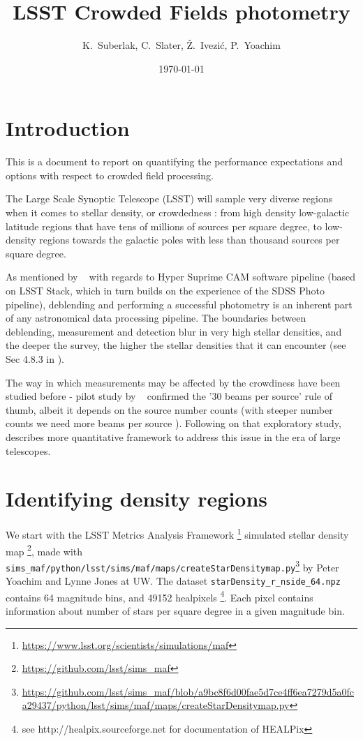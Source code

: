 \documentclass[DM,lsstdraft,toc,usenatbib]{lsstdoc}
\title[Crowded fields ]{LSST  Crowded Fields photometry}
\author{
K.~Suberlak, C.~Slater,
\v{Z}.~Ivezi\'c, P.~Yoachim}
\date{\today}
\begin{document}
\maketitle

\section{Introduction}

This is a document to report on quantifying the performance expectations and options with respect to crowded field processing.

The Large Scale Synoptic Telescope (LSST) will sample very diverse regions when it comes to stellar density, or crowdedness : from high density low-galactic latitude regions that have tens of millions of sources per square degree, to low-density regions towards the galactic poles with less than thousand sources per square degree. 

As mentioned by ~\cite{bosch2017} with regards to Hyper Suprime CAM software pipeline (based on LSST Stack, which in turn builds on the experience of the SDSS  Photo pipeline), deblending and performing a successful photometry is an inherent part of any astronomical data processing pipeline. The boundaries between deblending, measurement and detection blur in very high stellar densities, and the deeper the survey, the higher the stellar densities that it can encounter (see Sec 4.8.3 in \cite{bosch2017}). 

The way in which measurements may be affected by the crowdiness have been studied before - pilot study by ~\citep{hogg2001} confirmed the '30 beams per source' rule of thumb, albeit it depends on the source number counts (with steeper number counts we need more beams per source ). Following on that exploratory study,  ~\cite{olsen2003} describes more quantitative framework to address this issue in the era of large telescopes. 


\section{Identifying density regions}
We start with the LSST  Metrics Analysis Framework \footnote{\url{https://www.lsst.org/scientists/simulations/maf}} simulated stellar density map \footnote{\url{https://github.com/lsst/sims_maf}}, made with \verb|sims_maf/python/lsst/sims/maf/maps/createStarDensitymap.py|\footnote{\url{https://github.com/lsst/sims_maf/blob/a9bc8f6d00fae5d7ce4ff6ea7279d5a0fca29437/python/lsst/sims/maf/maps/createStarDensitymap.py}} by Peter Yoachim and Lynne Jones at UW. The dataset \verb|starDensity_r_nside_64.npz| contains 64 magnitude bins, and 49152  healpixels \footnote{see http://healpix.sourceforge.net for documentation of HEALPix}. Each pixel contains information about number of stars per square degree in a given magnitude bin.  
\end{document}
